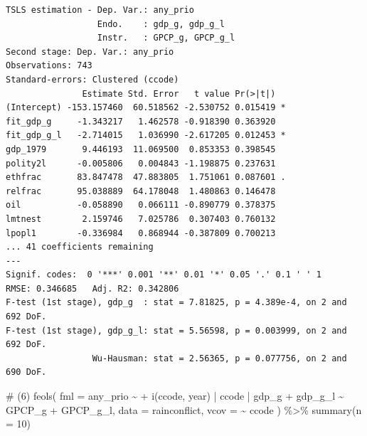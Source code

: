 \documentclass[
  a4paper,
  DIV=11,
  oneside]{scrreprt}
\newenvironment{Shaded}{\begin{snugshade}}{\end{snugshade}}
\newcommand{\AttributeTok}[1]{\textcolor[rgb]{0.40,0.45,0.13}{#1}}
\newcommand{\CommentTok}[1]{\textcolor[rgb]{0.37,0.37,0.37}{#1}}
\newcommand{\DecValTok}[1]{\textcolor[rgb]{0.68,0.00,0.00}{#1}}
\newcommand{\FunctionTok}[1]{\textcolor[rgb]{0.28,0.35,0.67}{#1}}
\newcommand{\NormalTok}[1]{\textcolor[rgb]{0.00,0.23,0.31}{#1}}
\newcommand{\SpecialCharTok}[1]{\textcolor[rgb]{0.37,0.37,0.37}{#1}}
\begin{document}
\begin{verbatim}
TSLS estimation - Dep. Var.: any_prio
                  Endo.    : gdp_g, gdp_g_l
                  Instr.   : GPCP_g, GPCP_g_l
Second stage: Dep. Var.: any_prio
Observations: 743
Standard-errors: Clustered (ccode) 
               Estimate Std. Error   t value Pr(>|t|)    
(Intercept) -153.157460  60.518562 -2.530752 0.015419 *  
fit_gdp_g     -1.343217   1.462578 -0.918390 0.363920    
fit_gdp_g_l   -2.714015   1.036990 -2.617205 0.012453 *  
gdp_1979       9.446193  11.069500  0.853353 0.398545    
polity2l      -0.005806   0.004843 -1.198875 0.237631    
ethfrac       83.847478  47.883805  1.751061 0.087601 .  
relfrac       95.038889  64.178048  1.480863 0.146478    
oil           -0.058890   0.066111 -0.890779 0.378375    
lmtnest        2.159746   7.025786  0.307403 0.760132    
lpopl1        -0.336984   0.868944 -0.387809 0.700213    
... 41 coefficients remaining
---
Signif. codes:  0 '***' 0.001 '**' 0.01 '*' 0.05 '.' 0.1 ' ' 1
RMSE: 0.346685   Adj. R2: 0.342806
F-test (1st stage), gdp_g  : stat = 7.81825, p = 4.389e-4, on 2 and 692 DoF.
F-test (1st stage), gdp_g_l: stat = 5.56598, p = 0.003999, on 2 and 692 DoF.
                 Wu-Hausman: stat = 2.56365, p = 0.077756, on 2 and 690 DoF.
\end{verbatim}

\begin{Shaded}
\begin{Highlighting}[]
\CommentTok{\# (6)}
\FunctionTok{feols}\NormalTok{(}
  \AttributeTok{fml =}\NormalTok{ any\_prio }\SpecialCharTok{\textasciitilde{}} 
  \SpecialCharTok{+} \FunctionTok{i}\NormalTok{(ccode, year)}
  \SpecialCharTok{|}\NormalTok{ ccode}
  \SpecialCharTok{|}\NormalTok{ gdp\_g }\SpecialCharTok{+}\NormalTok{ gdp\_g\_l }\SpecialCharTok{\textasciitilde{}}\NormalTok{ GPCP\_g }\SpecialCharTok{+}\NormalTok{ GPCP\_g\_l, }
  \AttributeTok{data =}\NormalTok{ rainconflict,}
  \AttributeTok{vcov =} \SpecialCharTok{\textasciitilde{}}\NormalTok{ ccode}
\NormalTok{) }\SpecialCharTok{\%\textgreater{}\%} 
  \FunctionTok{summary}\NormalTok{(}\AttributeTok{n =} \DecValTok{10}\NormalTok{)}
\end{Highlighting}
\end{Shaded}
\end{document}
